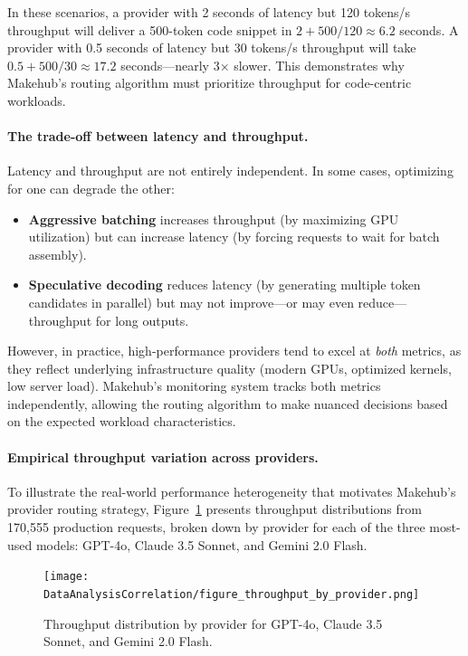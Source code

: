 \documentclass[english]{article}
\begin{document}
In these scenarios, a provider with 2 seconds of latency but 120 tokens/s throughput will deliver a 500-token code snippet in $2 + 500/120 \approx 6.2$ seconds. A provider with 0.5 seconds of latency but 30 tokens/s throughput will take $0.5 + 500/30 \approx 17.2$ seconds—nearly 3× slower. This demonstrates why Makehub's routing algorithm must prioritize throughput for code-centric workloads.

\paragraph{The trade-off between latency and throughput.}

Latency and throughput are not entirely independent. In some cases, optimizing for one can degrade the other:
\begin{itemize}
    \item \textbf{Aggressive batching} increases throughput (by maximizing GPU utilization) but can increase latency (by forcing requests to wait for batch assembly).
    \item \textbf{Speculative decoding} reduces latency (by generating multiple token candidates in parallel) but may not improve—or may even reduce—throughput for long outputs.
\end{itemize}

However, in practice, high-performance providers tend to excel at \emph{both} metrics, as they reflect underlying infrastructure quality (modern GPUs, optimized kernels, low server load). Makehub's monitoring system tracks both metrics independently, allowing the routing algorithm to make nuanced decisions based on the expected workload characteristics.

\paragraph{Empirical throughput variation across providers.}

To illustrate the real-world performance heterogeneity that motivates Makehub's provider routing strategy, Figure~\ref{fig:throughput_by_provider} presents throughput distributions from 170,555 production requests, broken down by provider for each of the three most-used models: GPT-4o, Claude 3.5 Sonnet, and Gemini 2.0 Flash.

\begin{figure}[H]
\centering
\texttt{[image: DataAnalysisCorrelation/figure\_throughput\_by\_provider.png]}
\caption{Throughput distribution by provider for GPT-4o, Claude 3.5 Sonnet, and Gemini 2.0 Flash.}
\label{fig:throughput_by_provider}
\end{figure}
\end{document}
